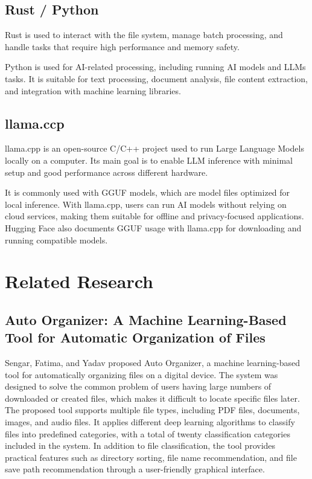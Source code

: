 \documentclass[12pt,oneside,openright,a4paper]{cpe-english-project}
\begin{document}
\subsection{Rust / Python}
Rust is used to interact with the file system, manage batch processing, and handle tasks that require high performance and memory safety.

Python is used for AI-related processing, including running AI models and LLMs tasks. It is suitable for text processing, document analysis, file content extraction, and integration with machine learning libraries.

\subsection{llama.ccp}
llama.cpp is an open-source C/C++ project used to run Large Language Models locally on a computer. Its main goal is to enable LLM inference with minimal setup and good performance across different hardware.

It is commonly used with GGUF models, which are model files optimized for local inference. With llama.cpp, users can run AI models without relying on cloud services, making them suitable for offline and privacy-focused applications. Hugging Face also documents GGUF usage with llama.cpp for downloading and running compatible models.

\section{Related Research}
\subsection{Auto Organizer: A Machine Learning-Based Tool for Automatic Organization of          Files}
Sengar, Fatima, and Yadav proposed Auto Organizer, a machine learning-based tool for automatically organizing files on a digital device. The system was designed to solve the common problem of users having large numbers of downloaded or created files, which makes it difficult to locate specific files later. The proposed tool supports multiple file types, including PDF files, documents, images, and audio files. It applies different deep learning algorithms to classify files into predefined categories, with a total of twenty classification categories included in the system. In addition to file classification, the tool provides practical features such as directory sorting, file name recommendation, and file save path recommendation through a user-friendly graphical interface.
\end{document}
